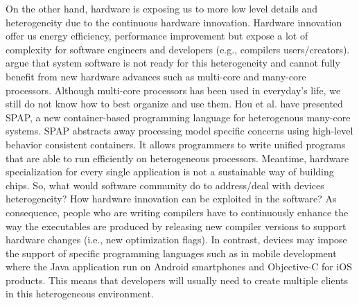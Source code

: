 On the other hand, hardware is exposing us to more low level details and heterogeneity due to the continuous hardware innovation. 
Hardware innovation offer us energy efficiency, performance improvement but expose a lot of complexity for software engineers and developers (e.g., compilers users/creators).
\cite{he2010computer} argue that system software is not ready for this heterogeneity and cannot fully benefit from new hardware advances such as multi-core and many-core processors. Although multi-core processors has been used in everyday’s life, we still do not know how to best organize and use them. Hou et al.\cite{hou2010spap} have presented SPAP, a new container-based programming language for heterogenous many-core systems. SPAP abstracts away processing model specific concerns using high-level behavior consistent containers. It allows programmers to write unified programs that are able to run efficiently on heterogeneous processors.
Meantime, hardware specialization for every single application is not a sustainable way of building chips.
So, what would software community do to address/deal with devices heterogeneity? How hardware innovation can be exploited in the software?
As consequence, people who are writing compilers have to continuously enhance the way the executables are produced by releasing new compiler versions to support hardware changes (i.e., new optimization flags).
In contrast, devices may impose the support of specific programming languages such as in mobile development where the Java application run on Android smartphones and Objective-C for iOS products. This means that developers will usually need to
create multiple clients in this heterogeneous environment.

 








